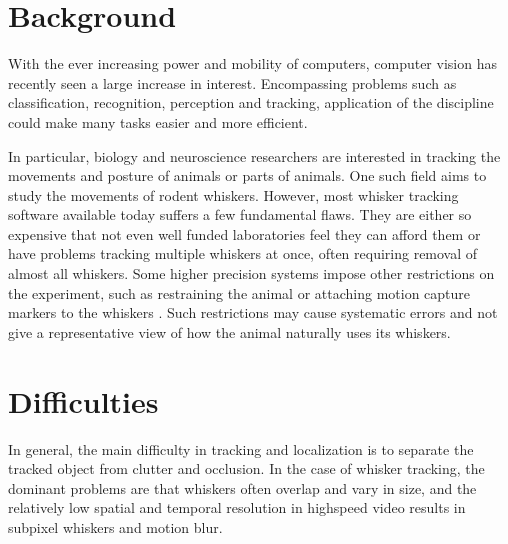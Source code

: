 \section{Background}





With the ever increasing power and mobility of computers, computer vision has recently seen a large increase in interest. 
Encompassing problems such as classification, recognition, perception and tracking, application of the discipline could make many tasks easier and more efficient.

In particular, biology and neuroscience researchers are interested in tracking the movements and posture \cite{WhiskerVideography} of animals or parts of animals.
One such field aims to study the movements of rodent whiskers. However, most whisker tracking software available today suffers a few fundamental flaws.
They are either so expensive that not even well funded laboratories feel they can afford them or have problems tracking multiple whiskers at once, often requiring removal of almost all whiskers. 
Some higher precision systems impose other restrictions on the experiment, such as restraining the animal or attaching motion 
capture markers to the whiskers \cite{BadExample1}. Such restrictions may cause systematic errors and not give 
a representative view of how the animal naturally uses its whiskers.

\section{Difficulties}
In general, the main difficulty in tracking and localization is to separate the tracked object from clutter
and occlusion. In the case of whisker tracking, the dominant problems are that whiskers often overlap and vary in size, 
and the relatively low spatial and temporal resolution\cite{WhiskerVideography} in highspeed video results in subpixel whiskers and motion blur.

